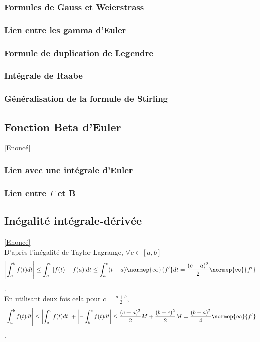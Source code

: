 \documentclass{book}
\begin{document}
	\subsubsection{Formules de Gauss et Weierstrass}
	\subsubsection{Lien entre les gamma d'Euler}
	\subsubsection{Formule de duplication de Legendre}
	\subsubsection{Intégrale de Raabe}
	\subsubsection{Généralisation de la formule de Stirling}
	\subsection{Fonction Beta d'Euler}\label{sec:fonction-beta-deuler}
	\textcolor{blue}{\hyperref[Fonction Bêta d'Euler]{[Enoncé]}}\\
	\subsubsection{Lien avec une intégrale d'Euler}
	\subsubsection{Lien entre $\Gamma$ et B}
	\subsection{Inégalité intégrale-dérivée }\label{sec:inegalite-integrale-derivee-etoile1}
	\textcolor{blue}{\hyperref[inegaliteintder]{[Enoncé]}}\\
	D'après l'inégalité de Taylor-Lagrange, $\forall c\in [a,b]$ \[\displaystyle\left|\int_a^b f(t)dt\right|\leq \int_a^c|f(t)-f(a)|dt\leq \int_a^c(t-a)\normep{\infty}{f'}dt=\frac{(c-a)^2}{2}\normep{\infty}{f'}\].\\
	En utilisant deux fois cela pour $c=\displaystyle\frac{a+b}{2}$,\\
	\[\displaystyle\left|\int_a^b f(t)dt\right|\leq \left|\int_a^cf(t)dt\right|+\left|-\int_b^cf(t)dt\right|\leq \frac{(c-a)^2}{2}M+\frac{(b-c)^2}{2}M=\frac{(b-a)^2}{4}\normep{\infty}{f'}\].
	
\end{document}
